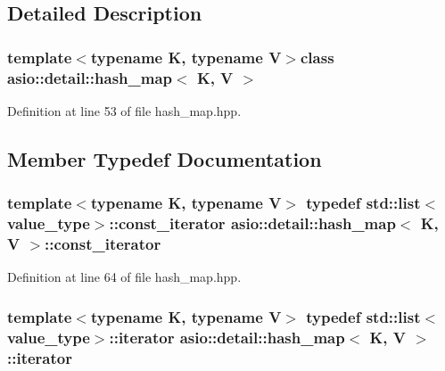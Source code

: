 \subsection{Detailed Description}
\subsubsection*{template$<$typename K, typename V$>$class asio\+::detail\+::hash\+\_\+map$<$ K, V $>$}



Definition at line 53 of file hash\+\_\+map.\+hpp.



\subsection{Member Typedef Documentation}
\hypertarget{classasio_1_1detail_1_1hash__map_ab0e2b29d40bba3e3c772850e6dbca0d5}{}
\subsubsection[{const\+\_\+iterator}]{\setlength{\rightskip}{0pt plus 5cm}template$<$typename K, typename V$>$ typedef std\+::list$<${\bf value\+\_\+type}$>$\+::{\bf const\+\_\+iterator} {\bf asio\+::detail\+::hash\+\_\+map}$<$ K, V $>$\+::{\bf const\+\_\+iterator}}\label{classasio_1_1detail_1_1hash__map_ab0e2b29d40bba3e3c772850e6dbca0d5}


Definition at line 64 of file hash\+\_\+map.\+hpp.

\hypertarget{classasio_1_1detail_1_1hash__map_a0f24b597db0331311f431ad015e3b558}{}
\subsubsection[{iterator}]{\setlength{\rightskip}{0pt plus 5cm}template$<$typename K, typename V$>$ typedef std\+::list$<${\bf value\+\_\+type}$>$\+::{\bf iterator} {\bf asio\+::detail\+::hash\+\_\+map}$<$ K, V $>$\+::{\bf iterator}}\label{classasio_1_1detail_1_1hash__map_a0f24b597db0331311f431ad015e3b558}


